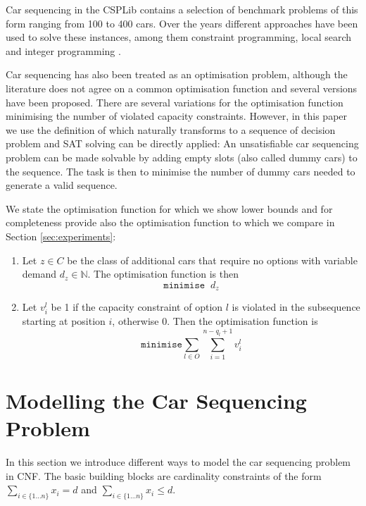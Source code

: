 \documentclass[]{llncs}
\def\min{{\texttt{minimise}}}
\begin{document}
Car sequencing in the CSPLib contains a selection of benchmark problems of this form ranging from 100 to 400 cars. Over
the years different approaches have been used to solve these instances, among them constraint programming, local search
and integer programming \cite{Regin97}\cite{Gottlieb03}\cite{Gravel05}\cite{Estellon06}\cite{Siala12}.

Car sequencing has also been treated as an optimisation problem, although the literature does not agree on a common
optimisation function and several versions have been proposed. There are several variations for the optimisation
function minimising the number of violated capacity constraints. However, in this paper we use the definition of
\cite{Perron04} which naturally transforms to a sequence of decision problem and SAT solving can be directly applied:
An unsatisfiable car sequencing problem can be made solvable by adding empty slots (also called dummy cars) to
the sequence. The task is then to minimise the number of dummy cars needed to generate a valid sequence.
          
We state the optimisation function for which we show lower bounds and for completeness provide also the optimisation
function to which we compare in Section \ref{sec:experiments}: 

\begin{enumerate} 
    \item Let $z\in C$ be the class of additional cars that require no options with variable demand $d_z \in
    \mathbb{N}$. The optimisation function is then $$\min \;\; d_z$$
    \item Let $v^l_{i}$ be 1 if the capacity constraint of option $l$ is violated in the subsequence starting at
        position $i$, otherwise 0. Then the optimisation function is $$\min \sum_{l\in O} \sum_{i=1}^{n-q_l+1} v_i^l$$
\end{enumerate} 


\section{Modelling the Car Sequencing Problem}
\label{sec:modelling}

In this section we introduce different ways to model the car sequencing problem in CNF. The basic building blocks are
cardinality constraints of the form $\sum_{i\in \{1\ldots n\}} x_{i} = d$ and $ \sum_{i\in \{1\ldots n\}} x_{i} \leq d
$.
\end{document}
